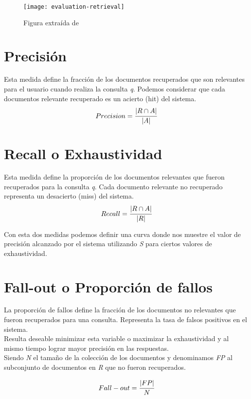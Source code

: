 	\begin{figure}[h]
		\texttt{[image: evaluation-retrieval]}
		\centering
		\caption{Figura extraída de \cite{baeza2011}}
	\end{figure}

\section{Precisión}
Esta medida define la fracción de los documentos recuperados que son relevantes para el usuario cuando realiza la consulta \textit{q}. Podemos considerar que cada documentos relevante recuperado es un acierto (hit) del sistema. \\

					\begin{equation}
						Precision = \cfrac{|R \cap A|}{|A|}
					\end{equation}
	
\section{Recall o Exhaustividad}
Esta medida define la proporción de los documentos relevantes que fueron recuperados para la consulta \textit{q}. Cada documento relevante no recuperado representa un desacierto (miss) del sistema. \\

					\begin{equation}
						Recall = \cfrac{|R \cap A|}{|R|}
					\end{equation}
					
Con esta dos medidas podemos definir una curva donde nos muestre el valor de precisión alcanzado por el sistema utilizando \textit{S} para ciertos valores de exhaustividad. \\
	
\section{Fall-out o Proporción de fallos}
La proporción de fallos define la fracción de los documentos no relevantes que fueron recuperados para una consulta. Representa la tasa de falsos positivos en el sistema.\\
Resulta deseable minimizar esta variable o maximizar la exhaustividad y al mismo tiempo lograr mayor precisión en las respuestas. \\
Siendo \textit{N} el tamaño de la colección de los documentos y denominamos \textit{FP} al subconjunto de documentos en \textit{R} que no fueron recuperados.

					\begin{equation}
						Fall-out = \cfrac{|FP|}{N}
					\end{equation}

